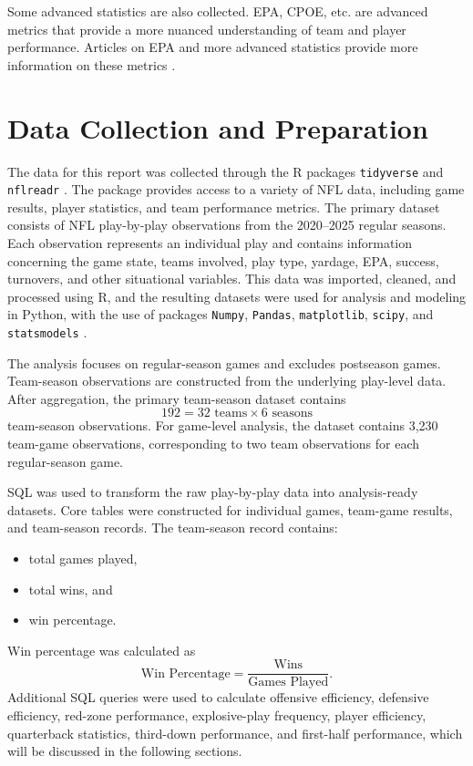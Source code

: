 \documentclass[11pt]{article}
\begin{document}
Some advanced statistics are also collected. EPA, CPOE, etc. are advanced metrics that provide a more nuanced understanding of team and player performance. Articles on EPA and more advanced statistics provide more information on these metrics \cite{nfl_advanced,espn_epa}.

\section*{Data Collection and Preparation}
The data for this report was collected through the R packages \texttt{tidyverse} and \texttt{nflreadr} \cite{nflreadr, tidyverse}. The package provides access to a variety of NFL data, including game results, player statistics, and team performance metrics. The primary dataset consists of NFL play-by-play observations from the 2020--2025 regular seasons. Each observation represents an individual play and contains information concerning the game state, teams involved, play type, yardage, EPA, success, turnovers, and other situational variables. This data was imported, cleaned, and processed using R, and the resulting datasets were used for analysis and modeling in Python, with the use of packages \texttt{Numpy}, \texttt{Pandas}, \texttt{matplotlib}, \texttt{scipy}, and \texttt{statsmodels} \cite{numpy, pandas, matplotlib, scipy, statsmodels}.

The analysis focuses on regular-season games and excludes postseason games. Team-season observations are constructed from the underlying play-level data. After aggregation, the primary team-season dataset contains \[ 192 = 32 \text{ teams} \times 6 \text{ seasons} \] team-season observations. For game-level analysis, the dataset contains 3,230 team-game observations, corresponding to two team observations for each regular-season game.

SQL was used to transform the raw play-by-play data into analysis-ready datasets. Core tables were constructed for individual games, team-game results, and team-season records. The team-season record contains: \begin{itemize} \item total games played, \item total wins, and \item win percentage. \end{itemize} Win percentage was calculated as \[ \text{Win Percentage} = \frac{\text{Wins}}{\text{Games Played}}. \] Additional SQL queries were used to calculate offensive efficiency, defensive efficiency, red-zone performance, explosive-play frequency, player efficiency, quarterback statistics, third-down performance, and first-half performance, which will be discussed in the following sections.
\end{document}
